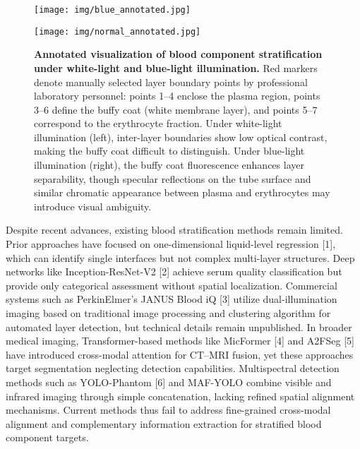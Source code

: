 \documentclass[journal,twoside,web]{ieeecolor}
\begin{document}
\begin{figure}[!t]
\centering

\newlength{\sepM}\setlength{\sepM}{10pt}      %
\newlength{\colw}\setlength{\colw}{0.45\linewidth} %
\newlength{\imgheight}

\begin{minipage}[t]{\colw}
  \centering
  \texttt{[image: img/blue\_annotated.jpg]}%
  \\
  \vspace{3pt}
\end{minipage}
\begin{minipage}[t]{\colw}
  \centering
  \texttt{[image: img/normal\_annotated.jpg]}\\
  \vspace{3pt}
\end{minipage}

\vspace{5pt}
\caption{\textbf{Annotated visualization of blood component stratification under white-light and blue-light illumination.}
Red markers denote manually selected layer boundary points by professional laboratory personnel: points 1–4 enclose the plasma region, points 3–6 define the buffy coat (white membrane layer), and points 5–7 correspond to the erythrocyte fraction. 
Under white-light illumination (left), inter-layer boundaries show low optical contrast, making the buffy coat difficult to distinguish. 
Under blue-light illumination (right), the buffy coat fluorescence enhances layer separability, though specular reflections on the tube surface and similar chromatic appearance between plasma and erythrocytes may introduce visual ambiguity.}
\label{fig:annotated images}
\end{figure}

Despite recent advances, existing blood stratification methods remain limited. Prior approaches have focused on one-dimensional liquid-level regression [1], which can identify single interfaces but not complex multi-layer structures. Deep networks like Inception-ResNet-V2 [2] achieve serum quality classification but provide only categorical assessment without spatial localization. Commercial systems such as PerkinElmer's JANUS Blood iQ [3] utilize dual-illumination imaging based on traditional image processing and clustering algorithm for automated layer detection, but technical details remain unpublished. In broader medical imaging, Transformer-based methods like MicFormer [4] and A2FSeg [5] have introduced cross-modal attention for CT–MRI fusion, yet these approaches target segmentation neglecting detection capabilities. Multispectral detection methods such as YOLO-Phantom [6] and MAF-YOLO combine visible and infrared imaging through simple concatenation, lacking refined spatial alignment mechanisms. Current methods thus fail to address fine-grained cross-modal alignment and complementary information extraction for stratified blood component targets.
\end{document}
